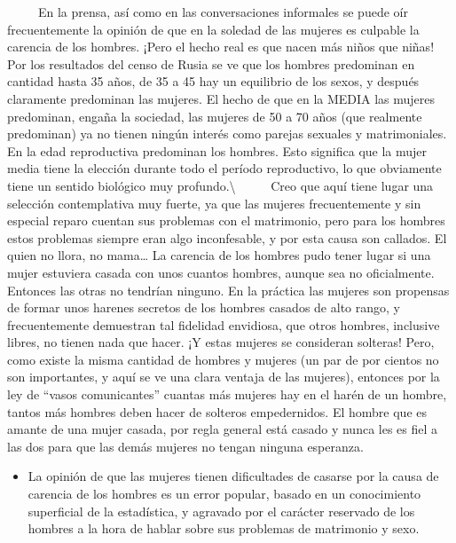 ~ ~ ~ En la prensa, así como en las conversaciones informales se puede
oír frecuentemente la opinión de que en la soledad de las mujeres es
culpable la carencia de los hombres. ¡Pero el hecho real es que nacen
más niños que niñas! Por los resultados del censo de Rusia se ve que los
hombres predominan en cantidad hasta 35 años, de 35 a 45 hay un
equilibrio de los sexos, y después claramente predominan las mujeres. El
hecho de que en la MEDIA las mujeres predominan, engaña la sociedad, las
mujeres de 50 a 70 años (que realmente predominan) ya no tienen ningún
interés como parejas sexuales y matrimoniales. En la edad reproductiva
predominan los hombres. Esto significa que la mujer media tiene la
elección durante todo el período reproductivo, lo que obviamente tiene
un sentido biológico muy profundo.\textbackslash{} ~ ~ ~ Creo que aquí
tiene lugar una selección contemplativa muy fuerte, ya que las mujeres
frecuentemente y sin especial reparo cuentan sus problemas con el
matrimonio, pero para los hombres estos problemas siempre eran algo
inconfesable, y por esta causa son callados. El quien no llora, no
mama\ldots{} La carencia de los hombres pudo tener lugar si una mujer
estuviera casada con unos cuantos hombres, aunque sea no oficialmente.
Entonces las otras no tendrían ninguno. En la práctica las mujeres son
propensas de formar unos harenes secretos de los hombres casados de alto
rango, y frecuentemente demuestran tal fidelidad envidiosa, que otros
hombres, inclusive libres, no tienen nada que hacer. ¡Y estas mujeres se
consideran solteras! Pero, como existe la misma cantidad de hombres y
mujeres (un par de por cientos no son importantes, y aquí se ve una
clara ventaja de las mujeres), entonces por la ley de ``vasos
comunicantes'' cuantas más mujeres hay en el harén de un hombre, tantos
más hombres deben hacer de solteros empedernidos. El hombre que es
amante de una mujer casada, por regla general está casado y nunca les es
fiel a las dos para que las demás mujeres no tengan ninguna esperanza.

\begin{itemize}
\tightlist
\item
  La opinión de que las mujeres tienen dificultades de casarse por la
  causa de carencia de los hombres es un error popular, basado en un
  conocimiento superficial de la estadística, y agravado por el carácter
  reservado de los hombres a la hora de hablar sobre sus problemas de
  matrimonio y sexo.
\end{itemize}

\protect\hypertarget{M15A}{}{}

